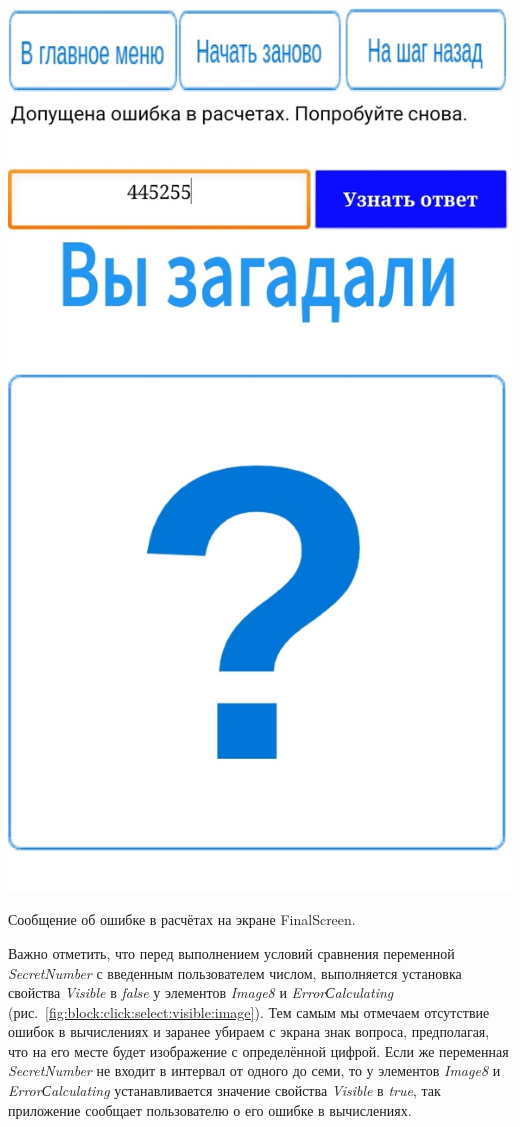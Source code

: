 \begin{marginfigure}[-2em]
\includegraphics{./graphics/programs/guess_numbers/finalScreen_Error_TheGuessingNumbersGame_AppInventor.jpg}
\caption[Сообщение об ошибке в расчётах на экране FinalScreen.]{Сообщение об ошибке в расчётах на экране FinalScreen.}
  \label{fig:block:final:screen:error}
\end{marginfigure}
Важно отметить, что перед выполнением условий сравнения переменной \textit{SecretNumber} с введенным пользователем числом, выполняется установка свойства \textit{Visible} в \textit{false} у элементов \textit{Image8} и \textit{ErrorСalculating} (рис.~\ref{fig:block:click:select:visible:image}).
Тем самым мы отмечаем отсутствие ошибок в вычислениях и заранее убираем с экрана знак вопроса, предполагая, что на его месте будет изображение с определённой цифрой. Если же переменная \textit{SecretNumber} не входит в интервал от одного до семи, то у элементов \textit{Image8} и \textit{ErrorСalculating} устанавливается значение свойства \textit{Visible} в \textit{true}, 
так приложение сообщает пользователю о его ошибке в вычислениях.

